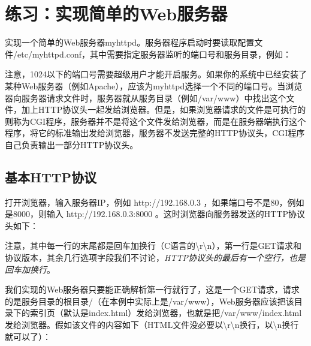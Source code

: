 
\section{练习：实现简单的Web服务器}
%
实现一个简单的Web服务器myhttpd。服务器程序启动时要读取配置文件/etc/\BookSplit{}myhttpd.\BookSplit{}conf，其中需要指定服务器监听的端口号和服务目录，例如：




注意，1024以下的端口号需要超级用户才能开启服务。如果你的系统中已经安装了某种Web服务器（例如Apache），应该为myhttpd选择一个不同的端口号。当浏览器向服务器请求文件时，服务器就从服务目录（例如/var/\BookSplit{}www）中找出这个文件，加上HTTP协议头一起发给浏览器。但是，如果浏览器请求的文件是可执行的则称为CGI程序，服务器并不是将这个文件发给浏览器，而是在服务器端执行这个程序，将它的标准输出发给浏览器，服务器不发送完整的HTTP协议头，CGI程序自己负责输出一部分HTTP协议头。


\subsection{基本HTTP协议}
%


打开浏览器，输入服务器IP，例如 http:\BookSplit{}/\BookSplit{}/\BookSplit{}192.\BookSplit{}168.\BookSplit{}0.\BookSplit{}3 ，如果端口号不是80，例如是8000，则输入 http:\BookSplit{}/\BookSplit{}/\BookSplit{}192.\BookSplit{}168.\BookSplit{}0.\BookSplit{}3:\BookSplit{}8000 。这时浏览器向服务器发送的HTTP协议头如下：




注意，其中每一行的末尾都是回车加换行（C语言的\BookQuoteChar{}\textbackslash{}r\textbackslash{}n\BookQuoteChar{}），第一行是GET请求和协议版本，其余几行选项字段我们不讨论，\emph{HTTP协议头的最后有一个空行，也是回车加换行}。



我们实现的Web服务器只要能正确解析第一行就行了，这是一个GET请求，请求的是服务目录的根目录/（在本例中实际上是/var/\BookSplit{}www），Web服务器应该把该目录下的索引页（默认是index.\BookSplit{}html）发给浏览器，也就是把/var/\BookSplit{}www/\BookSplit{}index.\BookSplit{}html发给浏览器。假如该文件的内容如下（HTML文件没必要以\BookQuoteChar{}\textbackslash{}r\textbackslash{}n\BookQuoteChar{}换行，以\BookQuoteChar{}\textbackslash{}n\BookQuoteChar{}换行就可以了）：


